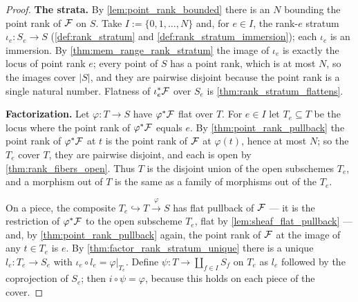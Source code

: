 \begin{proof}
  \leanok
  \textbf{The strata.}  By \cref{lem:point_rank_bounded} there is an \(N\)
  bounding the point rank of \(\mathcal{F}\) on \(S\).  Take
  \(I := \{0, 1, \dots, N\}\) and, for \(e \in I\), the rank-\(e\) stratum
  \(\iota_e : S_e \to S\)
  (\cref{def:rank_stratum} and \cref{def:rank_stratum_immersion}); each \(\iota_e\) is
  an immersion.  By \cref{thm:mem_range_rank_stratum} the image of
  \(\iota_e\) is exactly the locus of point rank \(e\); every point of
  \(S\) has a point rank, which is at most \(N\), so the images cover
  \(|S|\), and they are pairwise disjoint because the point rank is a
  single natural number.  Flatness of \(\iota_e^*\mathcal{F}\) over \(S_e\) is
  \cref{thm:rank_stratum_flattens}.

  \textbf{Factorization.}  Let \(\varphi : T \to S\) have \(\varphi^*\mathcal{F}\)
  flat over \(T\).  For \(e \in I\) let \(T_e \subseteq T\) be the locus
  where the point rank of \(\varphi^*\mathcal{F}\) equals \(e\).  By
  \cref{thm:point_rank_pullback} the point rank of \(\varphi^*\mathcal{F}\) at \(t\)
  is the point rank of \(\mathcal{F}\) at \(\varphi(t)\), hence at most \(N\); so
  the \(T_e\) cover \(T\), they are pairwise disjoint, and each is open by
  \cref{thm:rank_fibers_open}.  Thus \(T\) is the disjoint union of the
  open subschemes \(T_e\), and a morphism out of \(T\) is the same as a
  family of morphisms out of the \(T_e\).

  On a piece, the composite
  \(T_e \hookrightarrow T \xrightarrow{\varphi} S\) has flat pullback of
  \(\mathcal{F}\) --- it is the restriction of \(\varphi^*\mathcal{F}\) to the open subscheme
  \(T_e\), flat by \cref{lem:sheaf_flat_pullback} --- and, by
  \cref{thm:point_rank_pullback} again, the point rank of \(\mathcal{F}\) at the
  image of any \(t \in T_e\) is \(e\).  By
  \cref{thm:factor_rank_stratum_unique} there is a unique
  \(l_e : T_e \to S_e\) with \(\iota_e \circ l_e = \varphi|_{T_e}\).
  Define \(\psi : T \to \coprod_{f \in I} S_f\) on \(T_e\) as \(l_e\)
  followed by the coprojection of \(S_e\); then \(i \circ \psi = \varphi\),
  because this holds on each piece of the cover.


\end{proof}
